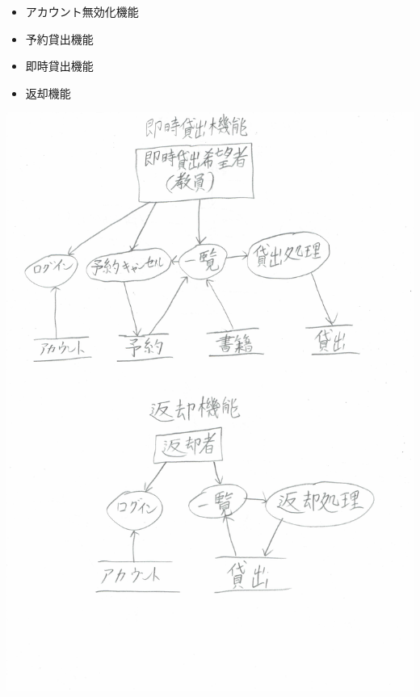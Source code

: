 \documentclass[a4paper]{jarticle}
\begin{document}
\begin{enumerate}
 \begin{itemize}
  \item アカウント無効化機能
  \item 予約貸出機能
  \item 即時貸出機能
  \item 返却機能
 \end{itemize}
 \begin{center}
 \includegraphics[width=15cm]{DFD1.JPG}
 \end{center}
 \begin{center}

\end{center}
\end{enumerate}
\end{document}
